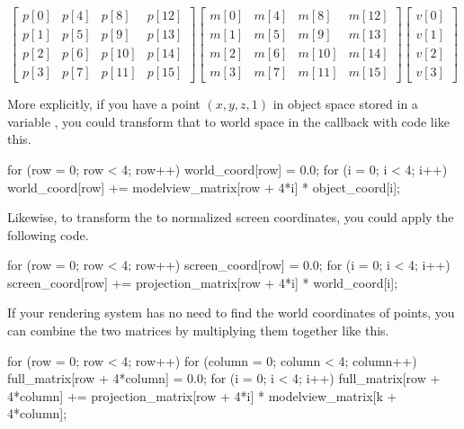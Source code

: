 \begin{displaymath}
  \left[
    \begin{array}{cccc}
      p[0] & p[4] & p[8] & p[12] \\
      p[1] & p[5] & p[9] & p[13] \\
      p[2] & p[6] & p[10] & p[14] \\
      p[3] & p[7] & p[11] & p[15]
    \end{array}
  \right]
  \left[
    \begin{array}{cccc}
      m[0] & m[4] & m[8] & m[12] \\
      m[1] & m[5] & m[9] & m[13] \\
      m[2] & m[6] & m[10] & m[14] \\
      m[3] & m[7] & m[11] & m[15]
    \end{array}
  \right]
  \left[
    \begin{array}{c}
      v[0] \\ v[1] \\ v[2] \\ v[3]
    \end{array}
  \right]
\end{displaymath}

More explicitly, if you have a point $(x, y, z, 1)$ in object space stored
in a variable , you could transform that to world
space in the callback with code like this.

\begin{code}
for (row = 0; row < 4; row++) {
    world_coord[row] = 0.0;
    for (i = 0; i < 4; i++) {
        world_coord[row] += modelview_matrix[row + 4*i] * object_coord[i];
    }
}
\end{code}

Likewise, to transform the  to normalized screen
coordinates, you could apply the following code.

\begin{code}
for (row = 0; row < 4; row++) {
    screen_coord[row] = 0.0;
    for (i = 0; i < 4; i++) {
        screen_coord[row] += projection_matrix[row + 4*i] * world_coord[i];
    }
}
\end{code}

If your rendering system has no need to find the world coordinates of
points, you can combine the two matrices by multiplying them together like
this.

\begin{code}
for (row = 0; row < 4; row++) {
    for (column = 0; column < 4; column++) {
        full_matrix[row + 4*column] = 0.0;
        for (i = 0; i < 4; i++) {
            full_matrix[row + 4*column] +=
                projection_matrix[row + 4*i] * modelview_matrix[k + 4*column];
        }
    }
}
\end{code}

